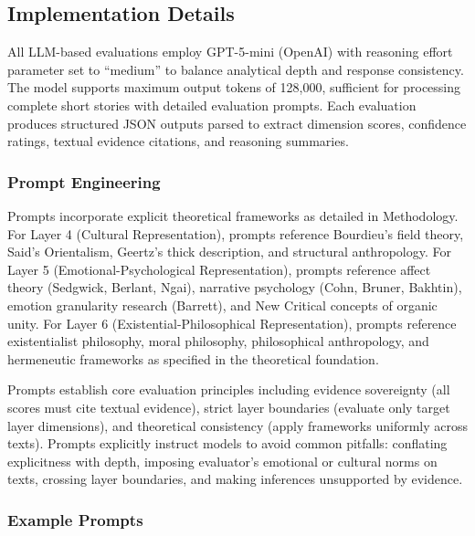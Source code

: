\subsection{Implementation Details}

All LLM-based evaluations employ GPT-5-mini (OpenAI) with reasoning effort parameter set to ``medium'' to balance analytical depth and response consistency. The model supports maximum output tokens of 128,000, sufficient for processing complete short stories with detailed evaluation prompts. Each evaluation produces structured JSON outputs parsed to extract dimension scores, confidence ratings, textual evidence citations, and reasoning summaries.

\subsubsection{Prompt Engineering}

Prompts incorporate explicit theoretical frameworks as detailed in Methodology. For Layer 4 (Cultural Representation), prompts reference Bourdieu's field theory, Said's Orientalism, Geertz's thick description, and structural anthropology. For Layer 5 (Emotional-Psychological Representation), prompts reference affect theory (Sedgwick, Berlant, Ngai), narrative psychology (Cohn, Bruner, Bakhtin), emotion granularity research (Barrett), and New Critical concepts of organic unity. For Layer 6 (Existential-Philosophical Representation), prompts reference existentialist philosophy, moral philosophy, philosophical anthropology, and hermeneutic frameworks as specified in the theoretical foundation.

Prompts establish core evaluation principles including evidence sovereignty (all scores must cite textual evidence), strict layer boundaries (evaluate only target layer dimensions), and theoretical consistency (apply frameworks uniformly across texts). Prompts explicitly instruct models to avoid common pitfalls: conflating explicitness with depth, imposing evaluator's emotional or cultural norms on texts, crossing layer boundaries, and making inferences unsupported by evidence.

\subsubsection{Example Prompts}


